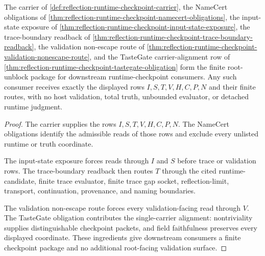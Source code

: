\begin{theorem}
\label{thm:reflection-runtime-checkpoint-root-unblock-package}
The carrier of \autoref{def:reflection-runtime-checkpoint-carrier}, the NameCert obligations of \autoref{thm:reflection-runtime-checkpoint-namecert-obligations}, the input-state exposure of \autoref{thm:reflection-runtime-checkpoint-input-state-exposure}, the trace-boundary readback of \autoref{thm:reflection-runtime-checkpoint-trace-boundary-readback}, the validation non-escape route of \autoref{thm:reflection-runtime-checkpoint-validation-nonescape-route}, and the TasteGate carrier-alignment row of \autoref{thm:reflection-runtime-checkpoint-tastegate-obligation} form the finite root-unblock package for downstream runtime-checkpoint consumers. Any such consumer receives exactly the displayed rows $I,S,T,V,H,C,P,N$ and their finite routes, with no host validation, total truth, unbounded evaluator, or detached runtime judgment.
\end{theorem}
\begin{proof}
The carrier supplies the rows $I,S,T,V,H,C,P,N$. The NameCert obligations identify the admissible reads of those rows and exclude every unlisted runtime or truth coordinate.

The input-state exposure forces reads through $I$ and $S$ before trace or validation rows. The trace-boundary readback then routes $T$ through the cited runtime-candidate, finite trace evaluator, finite trace gap socket, reflection-limit, transport, continuation, provenance, and naming boundaries.

The validation non-escape route forces every validation-facing read through $V$. The TasteGate obligation contributes the single-carrier alignment: nontriviality supplies distinguishable checkpoint packets, and field faithfulness preserves every displayed coordinate. These ingredients give downstream consumers a finite checkpoint package and no additional root-facing validation surface.
\end{proof}

